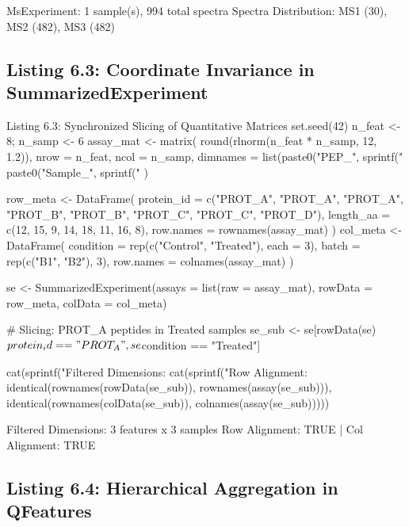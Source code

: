 \documentclass[11pt,twoside,openright]{book}
\begin{document}
\begin{routput}
MsExperiment: 1 sample(s), 994 total spectra
Spectra Distribution: MS1 (30), MS2 (482), MS3 (482)
\end{routput}

\subsection{Listing 6.3: Coordinate Invariance in SummarizedExperiment}

\begin{rchunk}{Listing 6.3: Synchronized Slicing of Quantitative Matrices}
set.seed(42)
n_feat <- 8; n_samp <- 6
assay_mat <- matrix(
  round(rlnorm(n_feat * n_samp, 12, 1.2)), nrow = n_feat, ncol = n_samp,
  dimnames = list(paste0("PEP_", sprintf("%
                  paste0("Sample_", sprintf("%
)

row_meta <- DataFrame(
  protein_id = c("PROT_A", "PROT_A", "PROT_A", "PROT_B", "PROT_B", "PROT_C", "PROT_C", "PROT_D"),
  length_aa  = c(12, 15, 9, 14, 18, 11, 16, 8),
  row.names  = rownames(assay_mat)
)
col_meta <- DataFrame(
  condition  = rep(c("Control", "Treated"), each = 3),
  batch      = rep(c("B1", "B2"), 3),
  row.names  = colnames(assay_mat)
)

se <- SummarizedExperiment(assays = list(raw = assay_mat),
                           rowData = row_meta, colData = col_meta)

# Slicing: PROT_A peptides in Treated samples
se_sub <- se[rowData(se)$protein_id == "PROT_A", se$condition == "Treated"]

cat(sprintf("Filtered Dimensions: %
cat(sprintf("Row Alignment: %
            identical(rownames(rowData(se_sub)), rownames(assay(se_sub))),
            identical(rownames(colData(se_sub)), colnames(assay(se_sub)))))
\end{rchunk}

\begin{routput}
Filtered Dimensions: 3 features x 3 samples
Row Alignment: TRUE | Col Alignment: TRUE
\end{routput}

\subsection{Listing 6.4: Hierarchical Aggregation in QFeatures}
\end{document}
